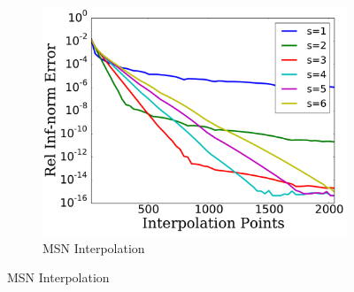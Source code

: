 
\begin{figure}[p]
    \centering
    \begin{subfigure}{0.45\textwidth}
    \includegraphics[width=\textwidth]{plots/msn_interp_fast_2n_rough_sharp_func.pdf}
    \caption{MSN Interpolation}
    \end{subfigure}


\end{figure}
